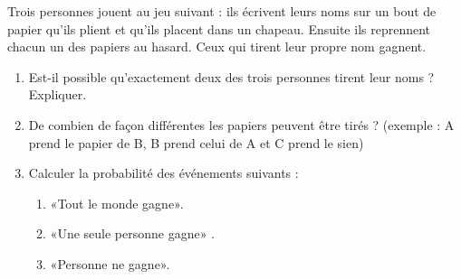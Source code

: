 
\begin{exercice}\label{exosmath-0188}

    Trois personnes jouent au jeu suivant : ils écrivent leurs noms sur un bout de papier qu'ils plient et qu'ils placent dans un chapeau. Ensuite ils reprennent chacun un des papiers au hasard. Ceux qui tirent leur propre nom gagnent.
    \begin{enumerate}
        \item
            Est-il possible qu'exactement deux des trois personnes tirent leur noms ? Expliquer.
        \item
            De combien de façon différentes les papiers peuvent être tirés ? (exemple : A prend le papier de B, B prend celui de A et C prend le sien) 
        \item
            Calculer la probabilité des événements suivants :
            \begin{enumerate}
                \item
                    «Tout le monde gagne».
                \item
                    «Une seule personne gagne» .
                \item
                    «Personne ne gagne».
            \end{enumerate}
    \end{enumerate}


\end{exercice}

